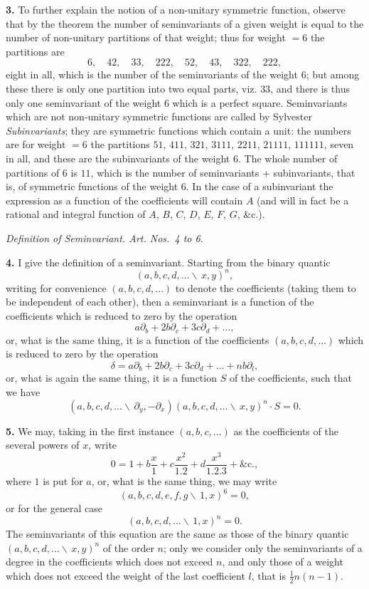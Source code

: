 \documentclass[12pt,a4paper]{article}
\theoremstyle{definition}
\begin{document}
\noindent\textbf{3.} To further explain the notion of a non-unitary symmetric function, observe that by the theorem the number of seminvariants of a given weight is equal to the number of non-unitary partitions of that weight; thus for weight $= 6$ the partitions are
\[
6,\quad 42,\quad 33,\quad 222,\quad 52,\quad 43,\quad 322,\quad 222,
\]
eight in all, which is the number of the seminvariants of the weight $6$; but among these there is only one partition into two equal parts, viz. $33$, and there is thus only one seminvariant of the weight $6$ which is a perfect square. Seminvariants which are not non-unitary symmetric functions are called by Sylvester \textit{Subinvariants}; they are symmetric functions which contain a unit: the numbers are for weight $= 6$ the partitions $51$, $411$, $321$, $3111$, $2211$, $21111$, $111111$, seven in all, and these are the subinvariants of the weight $6$. The whole number of partitions of $6$ is $11$, which is the number of seminvariants + subinvariants, that is, of symmetric functions of the weight $6$. In the case of a subinvariant the expression as a function of the coefficients will contain $A$ (and will in fact be a rational and integral function of $A$, $B$, $C$, $D$, $E$, $F$, $G$, \&c.).

\begin{center}
\textit{Definition of Seminvariant. Art. Nos.~4 to 6.}
\end{center}

\noindent\textbf{4.} I give the definition of a seminvariant. Starting from the binary quantic
\[
(a, b, c, d, \dots \!\!\!\backslash\, x, y)^n,
\]
writing for convenience $(a, b, c, d, \dots)$ to denote the coefficients (taking them to be independent of each other), then a seminvariant is a function of the coefficients which is reduced to zero by the operation
\[
a\partial_b + 2b\partial_c + 3c\partial_d + \dots,
\]
or, what is the same thing, it is a function of the coefficients $(a, b, c, d, \dots)$ which is reduced to zero by the operation
\[
\delta = a\partial_b + 2b\partial_c + 3c\partial_d + \dots + nb\partial_l,
\]
or, what is again the same thing, it is a function $S$ of the coefficients, such that we have
\[
(a, b, c, d, \dots \!\!\!\backslash\, \partial_y, -\partial_x)(a, b, c, d, \dots \!\!\!\backslash\, x, y)^n \cdot S = 0.
\]

\noindent\textbf{5.} We may, taking in the first instance $(a, b, c, \dots)$ as the coefficients of the several powers of $x$, write
\[
0 = 1 + b\frac{x}{1} + c\frac{x^2}{1.2} + d\frac{x^3}{1.2.3} + \&\text{c.},
\]
where $1$ is put for $a$, or, what is the same thing, we may write
\[
(a, b, c, d, e, f, g \!\!\!\backslash\, 1, x)^6 = 0,
\]
or for the general case
\[
(a, b, c, d, \dots \!\!\!\backslash\, 1, x)^n = 0.
\]
The seminvariants of this equation are the same as those of the binary quantic $(a, b, c, d, \dots \!\!\!\backslash\, x, y)^n$ of the order $n$; only we consider only the seminvariants of a degree in the coefficients which does not exceed $n$, and only those of a weight which does not exceed the weight of the last coefficient $l$, that is $\frac{1}{2}n(n-1)$.
\end{document}
